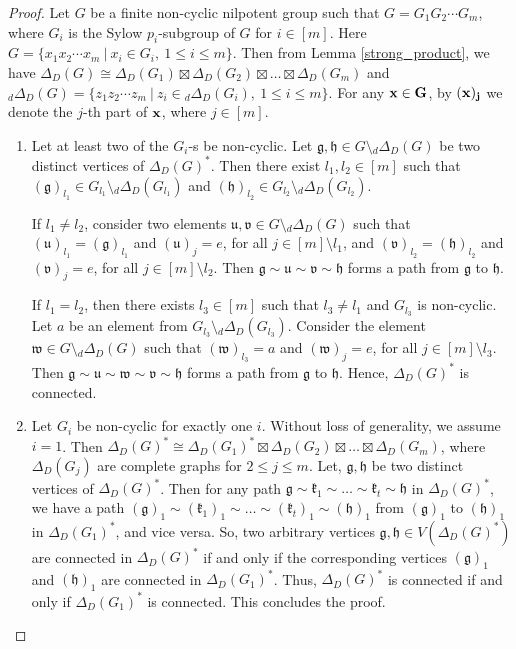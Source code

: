 \documentclass[12pt,a4paper]{article}
\begin{document}
\begin{proof}
Let $G$ be a finite non-cyclic nilpotent group such that $G=G_1G_2\cdots G_m$, where $G_i$ is the Sylow $p_i$-subgroup of $G$ for $i\in [m]$. Here $G=\{x_1x_2\cdots x_m~\vert~x_i\in G_i,~1\leq i\leq m\}$. Then from Lemma \ref{strong_product}, we have $\Delta_D(G)\cong\Delta_D(G_1)\boxtimes\Delta_D(G_2)\boxtimes\dots\boxtimes\Delta_D(G_m)$ and ${_d}\Delta_D(G)=\{z_1z_2\cdots z_m~\vert~z_i\in {_d}\Delta_D(G_i),~1\leq i\leq m\}$. For any $\bf{x}\in G$, by $(\bf{x})_j$ we denote the $j$-th part of $\bf{x}$, where $j\in [m]$.
\begin{enumerate}[\rm (i)]
    \item Let at least two of the $G_i$-s be non-cyclic. Let $\mathfrak{g},\mathfrak{h}\in G\setminus{_d}\Delta_D(G)$ be two distinct vertices of $\Delta_D(G)^*$. Then there exist $l_1,l_2\in [m]$ such that $(\mathfrak{g})_{l_1}\in G_{l_1}\setminus{_d}\Delta_D(G_{l_1})$ and $(\mathfrak{h})_{l_2}\in G_{l_2}\setminus{_d}\Delta_D(G_{l_2})$.
    
    If $l_1\neq l_2$, consider two elements $\mathfrak{u},\mathfrak{v}\in G\setminus{_d}\Delta_D(G)$ such that $(\mathfrak{u})_{l_1}=(\mathfrak{g})_{l_1}$ and $(\mathfrak{u})_j=e$, for all $j\in [m]\setminus l_1$, and $(\mathfrak{v})_{l_2}=(\mathfrak{h})_{l_2}$ and $(\mathfrak{v})_j=e$, for all $j\in [m]\setminus l_2$. Then $\mathfrak{g}\sim \mathfrak{u}\sim \mathfrak{v}\sim\mathfrak{h}$ forms a path from $\mathfrak{g}$ to $\mathfrak{h}$.

    If $l_1=l_2$, then there exists $l_3\in [m]$ such that $l_3\neq l_1$ and $G_{l_3}$ is non-cyclic. Let $a$ be an element from $G_{l_3}\setminus{_d}\Delta_D(G_{l_3})$. Consider the element $\mathfrak{w}\in G\setminus{_d}\Delta_D(G)$ such that $(\mathfrak{w})_{l_3}=a$ and $(\mathfrak{w})_j=e$, for all $j\in [m]\setminus l_3$. Then $\mathfrak{g}\sim \mathfrak{u}\sim \mathfrak{w}\sim \mathfrak{v}\sim\mathfrak{h}$ forms a path from $\mathfrak{g}$ to $\mathfrak{h}$. Hence, $\Delta_D(G)^*$ is connected.
    
    \item Let $G_i$ be non-cyclic for exactly one $i$. Without loss of generality, we assume $i=1$. Then $\Delta_D(G)^*\cong\Delta_D(G_1)^*\boxtimes\Delta_D(G_2)\boxtimes\dots\boxtimes\Delta_D(G_m)$, where $\Delta_D(G_j)$ are complete graphs for $2\leq j\leq m$. Let, $\mathfrak{g},\mathfrak{h}$ be two distinct vertices of $\Delta_D(G)^*$. Then for any path $\mathfrak{g}\sim\mathfrak{k}_1\sim\dots\sim\mathfrak{k}_t\sim\mathfrak{h}$ in $\Delta_D(G)^*$, we have a path $(\mathfrak{g})_1\sim(\mathfrak{k}_1)_1\sim\dots\sim(\mathfrak{k}_t)_1\sim(\mathfrak{h})_1$ from $(\mathfrak{g})_1$ to $(\mathfrak{h})_1$ in $\Delta_D(G_1)^*$, and vice versa. So, two arbitrary vertices $\mathfrak{g},\mathfrak{h}\in V(\Delta_D(G)^*)$ are connected in $\Delta_D(G)^*$ if and only if the corresponding vertices $(\mathfrak{g})_1$ and $(\mathfrak{h})_1$ are connected in $\Delta_D(G_1)^*$. Thus, $\Delta_D(G)^*$ is connected if and only if $\Delta_D(G_1)^*$ is connected. This concludes the proof.
\end{enumerate}
\end{proof}
\end{document}
